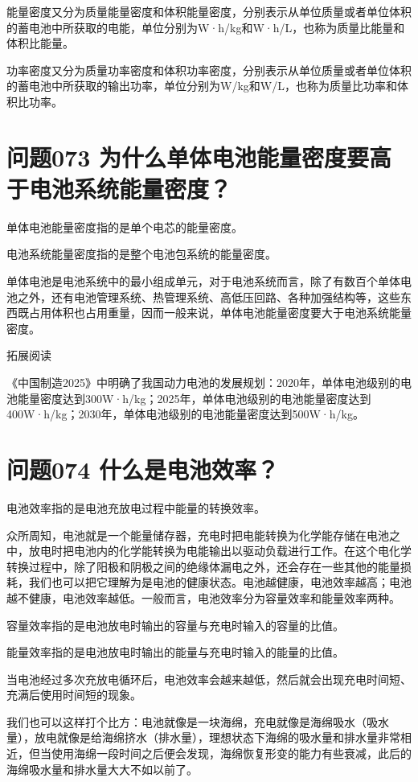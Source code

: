 \documentclass[12pt,UTF8]{ctexbook}
\begin{document}
能量密度又分为质量能量密度和体积能量密度，分别表示从单位质量或者单位体积的蓄电池中所获取的电能，单位分别为W·h/kg和W·h/L，也称为质量比能量和体积比能量。

功率密度又分为质量功率密度和体积功率密度，分别表示从单位质量或者单位体积的蓄电池中所获取的输出功率，单位分别为W/kg和W/L，也称为质量比功率和体积比功率。

\section{问题073 为什么单体电池能量密度要高于电池系统能量密度？}

单体电池能量密度指的是单个电芯的能量密度。

电池系统能量密度指的是整个电池包系统的能量密度。

单体电池是电池系统中的最小组成单元，对于电池系统而言，除了有数百个单体电池之外，还有电池管理系统、热管理系统、高低压回路、各种加强结构等，这些东西既占用体积也占用重量，因而一般来说，单体电池能量密度要大于电池系统能量密度。

拓展阅读

《中国制造2025》中明确了我国动力电池的发展规划：2020年，单体电池级别的电池能量密度达到300W·h/kg；2025年，单体电池级别的电池能量密度达到400W·h/kg；2030年，单体电池级别的电池能量密度达到500W·h/kg。

\section{问题074 什么是电池效率？}

电池效率指的是电池充放电过程中能量的转换效率。

众所周知，电池就是一个能量储存器，充电时把电能转换为化学能存储在电池之中，放电时把电池内的化学能转换为电能输出以驱动负载进行工作。在这个电化学转换过程中，除了阳极和阴极之间的绝缘体漏电之外，还会存在一些其他的能量损耗，我们也可以把它理解为是电池的健康状态。电池越健康，电池效率越高；电池越不健康，电池效率越低。一般而言，电池效率分为容量效率和能量效率两种。

容量效率指的是电池放电时输出的容量与充电时输入的容量的比值。

能量效率指的是电池放电时输出的能量与充电时输入的能量的比值。

当电池经过多次充放电循环后，电池效率会越来越低，然后就会出现充电时间短、充满后使用时间短的现象。

我们也可以这样打个比方：电池就像是一块海绵，充电就像是海绵吸水（吸水量），放电就像是给海绵挤水（排水量），理想状态下海绵的吸水量和排水量非常相近，但当使用海绵一段时间之后便会发现，海绵恢复形变的能力有些衰减，此后的海绵吸水量和排水量大大不如以前了。
\end{document}
